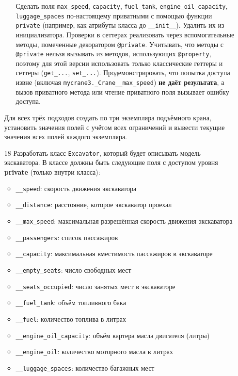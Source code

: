 \begin{enumerate}
\begin{enumerate}
    Сделать поля \texttt{max\_speed}, \texttt{capacity}, \texttt{fuel\_tank}, \texttt{engine\_oil\_capacity}, \texttt{luggage\_spaces} по-настоящему приватными с помощью функции \texttt{private} (например, как атрибуты класса до \texttt{\_\_init\_\_}). Удалить их из инициализатора.  
    Проверки в сеттерах реализовать через вспомогательные методы, помеченные декоратором \texttt{@private}.  
    Учитывать, что методы с \texttt{@private} нельзя вызывать из методов, использующих \texttt{@property}, поэтому для этой версии использовать только классические геттеры и сеттеры (\texttt{get\_...}, \texttt{set\_...}).  
    Продемонстрировать, что попытка доступа извне (включая \texttt{mycrane3.\_Crane\_\_max\_speed}) \textbf{не даёт результата}, а вызов приватного метода или чтение приватного поля вызывает ошибку доступа.
\end{enumerate}
Для всех трёх подходов создать по три экземпляра подъёмного крана, установить значения полей с учётом всех ограничений и вывести текущие значения всех полей каждого экземпляра.
\item[18] Разработать класс \texttt{Excavator}, который будет описывать модель экскаватора. В классе должны быть следующие поля с доступом уровня \textbf{private} (только внутри класса):
\begin{itemize}
    \item \texttt{\_\_speed}: скорость движения экскаватора  
    \item \texttt{\_\_distance}: расстояние, которое экскаватор проехал  
    \item \texttt{\_\_max\_speed}: максимальная разрешённая скорость движения экскаватора  
    \item \texttt{\_\_passengers}: список пассажиров  
    \item \texttt{\_\_capacity}: максимальная вместимость пассажиров в экскаваторе  
    \item \texttt{\_\_empty\_seats}: число свободных мест  
    \item \texttt{\_\_seats\_occupied}: число занятых мест в экскаваторе  
    \item \texttt{\_\_fuel\_tank}: объём топливного бака  
    \item \texttt{\_\_fuel}: количество топлива в литрах  
    \item \texttt{\_\_engine\_oil\_capacity}: объём картера масла двигателя (литры)  
    \item \texttt{\_\_engine\_oil}: количество моторного масла в литрах  
    \item \texttt{\_\_luggage\_spaces}: количество багажных мест  

\end{itemize}
\end{enumerate}
